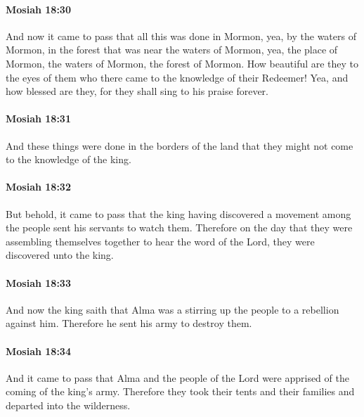 		\paragraph{Mosiah 18:30} %
			\label{MOSIAH-18-30}

			And now it came to pass that all this was done in Mormon,
			yea, by the waters of Mormon,
			in the forest that was near the waters of Mormon,
			yea, the place of Mormon, the waters of Mormon, the forest of Mormon.
			How beautiful are they to the eyes of them
			who there came to the knowledge of their Redeemer!
			Yea, and how blessed are they,
			for they shall sing to his praise forever.

		\paragraph{Mosiah 18:31} %
			\label{MOSIAH-18-31}

			And these things were done in the borders of the land
			that they might not come to the knowledge of the king.

		\paragraph{Mosiah 18:32} %
			\label{MOSIAH-18-32}

			But behold, it came to pass that
			the king having discovered a movement among the people
			sent his servants to watch them.
			Therefore on the day that they were assembling themselves together
			to hear the word of the Lord,
			they were discovered unto the king.

		\paragraph{Mosiah 18:33} %
			\label{MOSIAH-18-33}

			And now the king saith
			that Alma was a stirring up the people to a rebellion against him.
			Therefore he sent his army to destroy them.

		\paragraph{Mosiah 18:34} %
			\label{MOSIAH-18-34}

			And it came to pass that
			Alma and the people of the Lord were apprised of the coming of the king's army.
			Therefore they took their tents and their families and departed into the wilderness.

